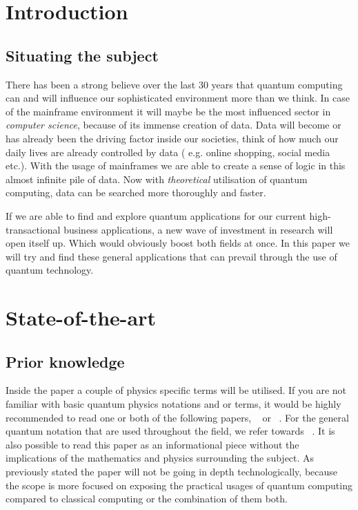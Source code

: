 \section{Introduction} %
\label{sec:Introduction}
\subsection{Situating the subject}
 There has been a strong believe over the last 30 years that quantum computing can and will influence our sophisticated environment more than we think. In case of the mainframe environment it will maybe be the most influenced sector in \emph{computer science}, because of its immense creation of data. Data will become or has already been the driving factor inside our societies, think of how much our daily lives are already controlled by data ( e.g. online shopping, social media etc.). With the usage of mainframes we are able to create a sense of logic in this almost infinite pile of data. Now with \emph{ theoretical} utilisation of quantum computing, data can be searched more thoroughly and faster. \autocite{Grover1996}
 
 If we are able to find and explore quantum applications for our current high-transactional business applications, a new wave of investment in research will open itself up. Which would obviously boost both fields at once. In this paper we will try and find these general applications that can prevail through the use of quantum technology.



\section{State-of-the-art}
\label{sec:state-of-the-art}
\subsection{Prior knowledge}
Inside the paper a couple of physics specific terms will be utilised. If you are not familiar with basic quantum physics notations and or terms, it would be highly recommended to read one or both of the following papers, ~\autocite{Rieffel1998} or ~\autocite{Shor2000}. For the general quantum notation that are used throughout the field, we refer towards ~\textcite{Dirac1939}. It is also possible to read this paper as an informational piece without the implications of the mathematics and physics surrounding the subject. As previously stated the paper will not be going in depth technologically, because the scope is more focused on exposing the practical usages of quantum computing compared to classical computing or the combination of them both.

